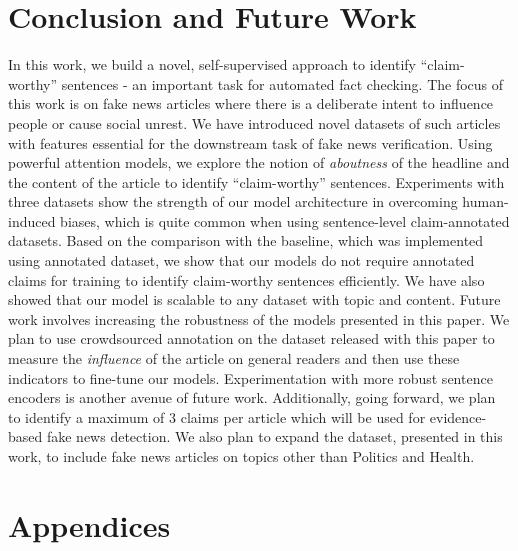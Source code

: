 \documentclass[11pt,a4paper]{article}
\begin{document}
\section{Conclusion and Future Work}
{In this work, we build a novel, self-supervised approach to identify ``claim-worthy'' sentences - an important task for automated fact checking. The focus of this work is on fake news articles where there is a deliberate intent to influence people or cause social unrest. We have introduced novel datasets of such articles with features essential for the downstream task of fake news verification. Using powerful attention models, we explore the notion of \textit{aboutness} of the headline and the content of the article to identify ``claim-worthy'' sentences. Experiments with three datasets show the strength of our model architecture in overcoming human-induced biases, which is quite common when using sentence-level claim-annotated datasets. Based on the comparison with the baseline, which was implemented using annotated dataset, we show that our models do not require annotated claims for training to identify claim-worthy sentences efficiently. We have also showed that our model is scalable to any dataset with topic and content.}\newline
{\indent Future work involves increasing the robustness of the models presented in this paper. We plan to use crowdsourced annotation on the dataset released with this paper to measure the \textit{influence} of the article on general readers and then use these indicators to fine-tune our models. Experimentation with more robust sentence encoders is another avenue of future work. Additionally, going forward, we plan to identify a maximum of 3 claims per article which will be used for evidence-based fake news detection. We also plan to expand the dataset, presented in this work, to include fake news articles on topics other than Politics and Health. 
}





\appendix

\section{Appendices}
\label{sec:appendix}
\end{document}
